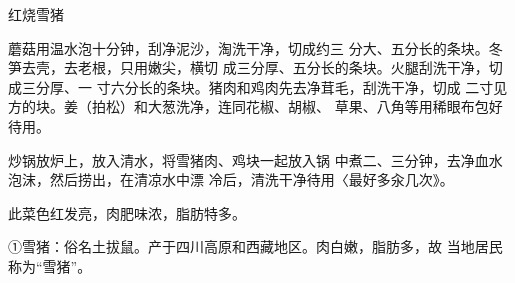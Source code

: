 \begin{recipe}{红烧雪猪}

\ingredients


\cooking

\step 	蘑菇用温水泡十分钟，刮净泥沙，淘洗干净，切成约三 分大、五分长的条块。冬笋去壳，去老根，只用嫩尖，横切 成三分厚、五分长的条块。火腿刮洗干净，切成三分厚、一 寸六分长的条块。猪肉和鸡肉先去净茸毛，刮洗干净，切成 二寸见方的块。姜（拍松）和大葱洗净，连同花椒、胡椒、 草果、八角等用稀眼布包好待用。

\step 	炒锅放炉上，放入清水，将雪猪肉、鸡块一起放入锅 中煮二、三分钟，去净血水泡沫，然后捞出，在清凉水中漂 冷后，清洗干净待用〈最好多汆几次》。

\ingredients


\notes

此菜色红发亮，肉肥味浓，脂肪特多。

①雪猪：俗名土拔鼠。产于四川高原和西藏地区。肉白嫩，脂肪多，故 当地居民称为“雪猪”。

\end{recipe}

